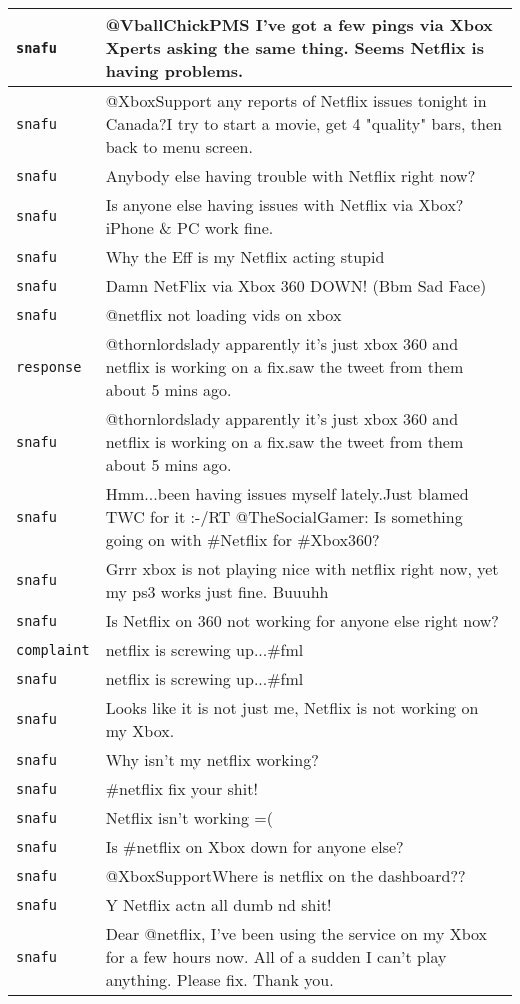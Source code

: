 {\begin{longtable}{|l|p{160mm}|}
      \tabularnewline\hline
         \texttt{snafu} & @VballChickPMS I've got a few pings via Xbox Xperts asking the same thing. Seems Netflix is having problems.
      \tabularnewline\hline
         \texttt{snafu} & @XboxSupport any reports of Netflix issues tonight in Canada?I try to start a movie, get 4 "quality" bars, then back to menu screen.
      \tabularnewline\hline
         \texttt{snafu} & Anybody else having trouble with Netflix right now?
      \tabularnewline\hline
         \texttt{snafu} & Is anyone else having issues with Netflix via Xbox? iPhone \& PC work fine.
      \tabularnewline\hline
         \texttt{snafu} & Why the Eff is my Netflix acting stupid
      \tabularnewline\hline
         \texttt{snafu} & Damn NetFlix via Xbox 360 DOWN! (Bbm Sad Face)
      \tabularnewline\hline
         \texttt{snafu} & @netflix not loading vids on xbox
      \tabularnewline\hline
         \texttt{response} & @thornlordslady apparently it's just xbox 360 and netflix is working on a fix.saw the tweet from them about 5 mins ago.
      \tabularnewline\hline
         \texttt{snafu} & @thornlordslady apparently it's just xbox 360 and netflix is working on a fix.saw the tweet from them about 5 mins ago.
      \tabularnewline\hline
         \texttt{snafu} & Hmm...been having issues myself lately.Just blamed TWC for it :-/RT @TheSocialGamer: Is something going on with \#Netflix for \#Xbox360?
      \tabularnewline\hline
         \texttt{snafu} & Grrr xbox is not playing nice with netflix right now, yet my ps3 works just fine. Buuuhh
      \tabularnewline\hline
         \texttt{snafu} & Is Netflix on 360 not working for anyone else right now?
      \tabularnewline\hline
         \texttt{complaint} & netflix is screwing up...\#fml
      \tabularnewline\hline
         \texttt{snafu} & netflix is screwing up...\#fml
      \tabularnewline\hline
         \texttt{snafu} & Looks like it is not just me, Netflix is not working on my Xbox.
      \tabularnewline\hline
         \texttt{snafu} & Why isn't my netflix working?
      \tabularnewline\hline
         \texttt{snafu} & \#netflix fix your shit!
      \tabularnewline\hline
         \texttt{snafu} & Netflix isn't working =(
      \tabularnewline\hline
         \texttt{snafu} & Is \#netflix on Xbox down for anyone else?
      \tabularnewline\hline
         \texttt{snafu} & @XboxSupportWhere is netflix on the dashboard??
      \tabularnewline\hline
         \texttt{snafu} & Y Netflix actn all dumb nd shit!
      \tabularnewline\hline
         \texttt{snafu} & Dear @netflix, I've been using the service on my Xbox for a few hours now. All of a sudden I can't play anything. Please fix. Thank you.

\end{longtable}}

